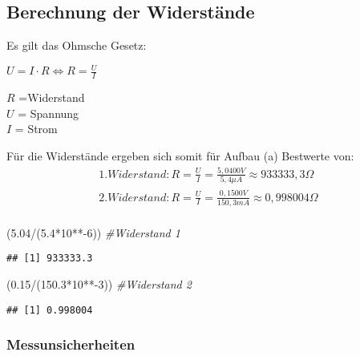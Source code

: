\documentclass[
  9pt,
]{article}
\newenvironment{Shaded}{\begin{snugshade}}{\end{snugshade}}
\newcommand{\CommentTok}[1]{\textcolor[rgb]{0.56,0.35,0.01}{\textit{#1}}}
\newcommand{\DecValTok}[1]{\textcolor[rgb]{0.00,0.00,0.81}{#1}}
\newcommand{\FloatTok}[1]{\textcolor[rgb]{0.00,0.00,0.81}{#1}}
\newcommand{\NormalTok}[1]{#1}
\newcommand{\SpecialCharTok}[1]{\textcolor[rgb]{0.00,0.00,0.00}{#1}}
\begin{document}
\hypertarget{berechnung-der-widerstuxe4nde}{%
\subsection{Berechnung der
Widerstände}\label{berechnung-der-widerstuxe4nde}}

Es gilt das Ohmsche Gesetz:

\(U=I\cdot R \Leftrightarrow R = \frac{U}{I}\)

\noindent \(R\) =Widerstand\\
\noindent \(U\) = Spannung\\
\noindent \(I\) = Strom

Für die Widerstände ergeben sich somit für Aufbau (a) Bestwerte von:
\begin{equation*}
\begin{split}
1. Widerstand: R=\frac{U}{I} = \frac {5,0400V}{5,4 \mu A} \approx 933333,3 \Omega \\
2.Widerstand: R=\frac{U}{I} = \frac {0,1500V}{150,3 mA} \approx 0,998004 \Omega \\
\end{split}
\end{equation*}

\begin{Shaded}
\begin{Highlighting}[]
\NormalTok{(}\FloatTok{5.04}\SpecialCharTok{/}\NormalTok{(}\FloatTok{5.4}\SpecialCharTok{*}\DecValTok{10}\SpecialCharTok{**{-}}\DecValTok{6}\NormalTok{)) }\CommentTok{\#Widerstand 1}
\end{Highlighting}
\end{Shaded}

\begin{verbatim}
## [1] 933333.3
\end{verbatim}

\begin{Shaded}
\begin{Highlighting}[]
\NormalTok{(}\FloatTok{0.15}\SpecialCharTok{/}\NormalTok{(}\FloatTok{150.3}\SpecialCharTok{*}\DecValTok{10}\SpecialCharTok{**{-}}\DecValTok{3}\NormalTok{)) }\CommentTok{\#Widerstand 2}
\end{Highlighting}
\end{Shaded}

\begin{verbatim}
## [1] 0.998004
\end{verbatim}

\hypertarget{messunsicherheiten-1}{%
\subsubsection{Messunsicherheiten}\label{messunsicherheiten-1}}
\end{document}
